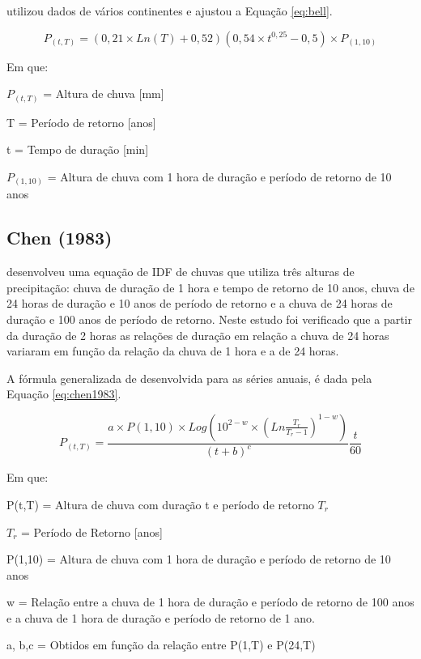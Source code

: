  utilizou dados de vários continentes e ajustou a Equação \ref{eq:bell}.

\begin{equation}
\label{eq:bell}
    P_{(t,T)} = (0,21 \times Ln(T) + 0,52)(0,54\times t^{0,25} -0,5) \times P_{(1,10)}
\end{equation}

Em que:

$P_{(t,T)}$ = Altura de chuva [mm]

T = Período de retorno [anos]

t = Tempo de duração [min]

$P_{(1,10)}$ = Altura de chuva com 1 hora de duração e período de retorno de 10 anos


\subsection{Chen (1983)}

 desenvolveu uma equação de IDF de chuvas que utiliza três alturas de precipitação: chuva de duração de 1 hora e tempo de retorno de 10 anos, chuva de 24 horas de duração e 10 anos de período de retorno e a chuva de 24 horas de duração e 100 anos de período de retorno. Neste estudo foi verificado que a partir da duração de 2 horas as relações de duração em relação a chuva de 24 horas variaram em função da relação da chuva de 1 hora e a de 24 horas.

A fórmula generalizada de  desenvolvida para as séries anuais, é dada pela Equação \ref{eq:chen1983}.

\begin{equation}
\label{eq:chen1983}
    P_{(t,T)} = \frac{a\times P(1,10)\times Log(10^{2-w}\times (Ln\frac{T_r}{T_r-1})^{1-w})}{(t+b)^c} \frac{t}{60}
\end{equation}

Em que:

P(t,T) = Altura de chuva com duração t e período de retorno $T_r$

$T_r$ = Período de Retorno [anos]

P(1,10) = Altura de chuva com 1 hora de duração e período de retorno de 10 anos

w = Relação entre a chuva de 1 hora de duração e período de retorno de 100 anos e a chuva de 1 hora de duração e período de retorno de 1 ano.

a, b,c = Obtidos em função da relação entre P(1,T) e P(24,T)
